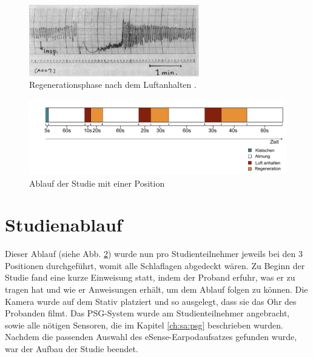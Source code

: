 \begin{figure}[ht]
    \centering
    \includegraphics[width=0.66\textwidth]{images/respiration/respiration_regeneration}
    \caption{Regenerationsphase nach dem Luftanhalten \cite{beath_rebreathing}.}
    \label{fig_respiration_regeneration}
\end{figure}

\begin{figure}[ht]
    \centering
    \includegraphics[width=1\textwidth]{images/study/study_flow2}
    \caption{Ablauf der Studie mit einer Position}
    \label{fig_study_flow}
\end{figure}

\section{Studienablauf}
Dieser Ablauf (siehe Abb. \ref{fig_study_flow}) wurde nun pro Studienteilnehmer jeweils bei den 3 Positionen durchgeführt, womit alle Schlaflagen abgedeckt wären.
Zu Beginn der Studie fand eine kurze Einweisung statt, indem der Proband erfuhr, was er zu tragen hat und wie er Anweisungen erhält, um dem Ablauf folgen zu können. 
Die Kamera wurde auf dem Stativ platziert und so ausgelegt, dass sie das Ohr des Probanden filmt. 
Das PSG-System wurde am Studienteilnehmer angebracht, sowie alle nötigen Sensoren, die im Kapitel \ref{ch:sa:psg} beschrieben wurden.
Nachdem die passenden Auswahl des eSense-Earpodaufsatzes gefunden wurde, war der Aufbau der Studie beendet.

